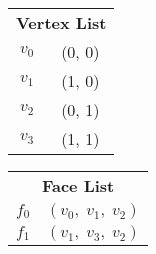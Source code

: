 \begin{figure}[!ht]
    \centering

    \vspace{1em}
    \begin{subfigure}{.25\textwidth}
        \centering

        \renewcommand{\arraystretch}{1.1}
        \begin{tabular}{ c|c| }
            \multicolumn{2}{c}{\bfseries\footnotesize\hspace{18pt} Vertex List} \\
            \cline{2-2}%
            $ v_0 $ & (0, 0) \\
            \cline{2-2}%
            $ v_1 $ & (1, 0) \\
            \cline{2-2}%
            $ v_2 $ & (0, 1) \\
            \cline{2-2}%
            $ v_3 $ & (1, 1) \\
            \cline{2-2}%
        \end{tabular}

        \vspace{3em}
        \caption{}
    \end{subfigure}%
    \begin{subfigure}{.25\textwidth}
        \centering

        \renewcommand{\arraystretch}{1.2}
        \begin{tabular}{ c|c| }
            \multicolumn{2}{c}{\bfseries\footnotesize\hspace{18pt} Face List} \\
            \cline{2-2}%
            $ f_0 $ & $ ( v_0, \; v_1, \; v_2 ) $ \\
            \cline{2-2}%
            $ f_1 $ & $ ( v_1, \; v_3, \; v_2 ) $ \\
            \cline{2-2}%
        \end{tabular}
        \vspace{29pt}

        \vspace{3em}
        \caption{}
    \end{subfigure}%
    \begin{subfigure}{.35\textwidth}
        \centering
        

\end{subfigure}
\end{figure}
